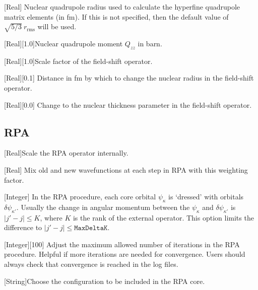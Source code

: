 \documentclass{report}
\begin{document}
[Real]{%
Nuclear quadrupole radius used to calculate the hyperfine quadrupole matrix elements (in fm). If this is not
specified, then the default value of $\sqrt{5/3} ~ r_{\textrm{rms}}$ will be used.%
}

[Real][1.0]{Nuclear quadrupole moment $Q_{zz}$ in barn.}

[Real][1.0]{Scale factor of the field-shift operator.}

[Real][0.1]{%
Distance in fm by which to change the nuclear radius in the field-shift operator.%
}

[Real][0.0]{%
Change to the nuclear thickness parameter in the field-shift operator.%
}

\subsection{RPA}

[Real]{Scale the RPA operator internally.}

[Real]{%
Mix old and new wavefunctions at each step in RPA with this weighting factor.%
}

[Integer]{%
In the RPA procedure, each core orbital $\psi_\kappa$ is `dressed' with orbitals $\delta\psi_{\kappa'}$. Usually the change in angular momentum between the $\psi_\kappa$ and $\delta\psi_{\kappa'}$ is $|j' - j| \leq K$, where $K$ is the rank of the external operator.
This option limits the difference to $|j' - j|\leq \texttt{MaxDeltaK}$.%
}

[Integer][100]{%
Adjust the maximum allowed number of iterations in the RPA procedure. Helpful if more iterations are needed for convergence. Users should always check that convergence is reached in the log files.%
}

[String]{Choose the configuration to be included in the RPA core.}


\end{document}
